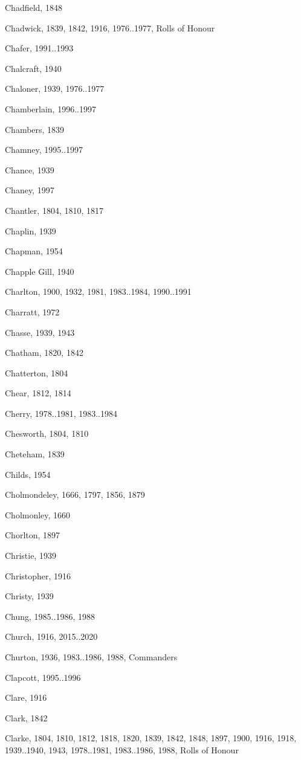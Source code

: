 \begin{theindex}
\item Chadfield, 1848
\item Chadwick, 1839, 1842, 1916, 1976..1977, Rolls of Honour
\item Chafer, 1991..1993
\item Chalcraft, 1940
\item Chaloner, 1939, 1976..1977
\item Chamberlain, 1996..1997
\item Chambers, 1839
\item Chamney, 1995..1997
\item Chance, 1939
\item Chaney, 1997
\item Chantler, 1804, 1810, 1817
\item Chaplin, 1939
\item Chapman, 1954
\item Chapple Gill, 1940
\item Charlton, 1900, 1932, 1981, 1983..1984, 1990..1991
\item Charratt, 1972
\item Chasse, 1939, 1943
\item Chatham, 1820, 1842
\item Chatterton, 1804
\item Chear, 1812, 1814
\item Cherry, 1978..1981, 1983..1984
\item Chesworth, 1804, 1810
\item Cheteham, 1839
\item Childs, 1954
\item Cholmondeley, 1666, 1797, 1856, 1879
\item Cholmonley, 1660
\item Chorlton, 1897
\item Christie, 1939
\item Christopher, 1916
\item Christy, 1939
\item Chung, 1985..1986, 1988
\item Church, 1916, 2015..2020
\item Churton, 1936, 1983..1986, 1988, Commanders
\item Clapcott, 1995..1996
\item Clare, 1916
\item Clark, 1842
\item Clarke, 1804, 1810, 1812, 1818, 1820, 1839, 1842, 1848, 1897, 1900, 1916, 1918, 1939..1940, 1943, 1978..1981, 1983..1986, 1988, Rolls of Honour

\end{theindex}
